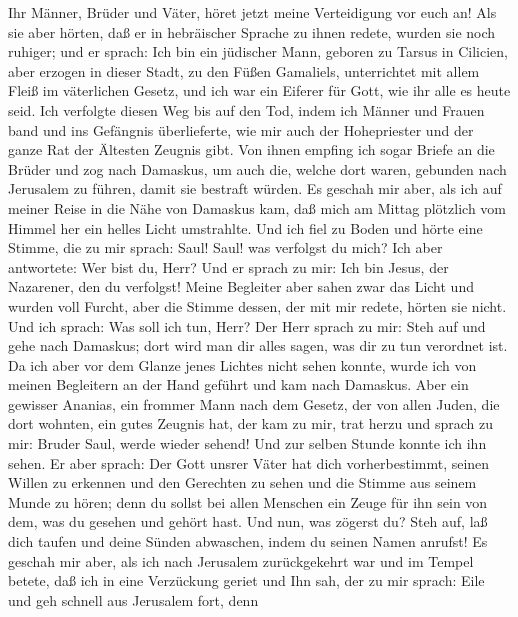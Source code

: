  Ihr Männer, Brüder und Väter, höret jetzt meine
Verteidigung vor euch an!  Als sie aber hörten, daß er in
hebräischer Sprache zu ihnen redete, wurden sie noch ruhiger; und er
sprach:  Ich bin ein jüdischer Mann, geboren zu Tarsus in
Cilicien, aber erzogen in dieser Stadt, zu den Füßen Gamaliels,
unterrichtet mit allem Fleiß im väterlichen Gesetz, und ich war ein
Eiferer für Gott, wie ihr alle es heute seid.  Ich
verfolgte diesen Weg bis auf den Tod, indem ich Männer und Frauen band
und ins Gefängnis überlieferte,  wie mir auch der
Hohepriester und der ganze Rat der Ältesten Zeugnis gibt. Von ihnen
empfing ich sogar Briefe an die Brüder und zog nach Damaskus, um auch
die, welche dort waren, gebunden nach Jerusalem zu führen, damit sie
bestraft würden.  Es geschah mir aber, als ich auf meiner
Reise in die Nähe von Damaskus kam, daß mich am Mittag plötzlich vom
Himmel her ein helles Licht umstrahlte.  Und ich fiel zu
Boden und hörte eine Stimme, die zu mir sprach: Saul! Saul! was
verfolgst du mich?  Ich aber antwortete: Wer bist du,
Herr? Und er sprach zu mir: Ich bin Jesus, der Nazarener, den du
verfolgst!  Meine Begleiter aber sahen zwar das Licht und
wurden voll Furcht, aber die Stimme dessen, der mit mir redete, hörten
sie nicht.  Und ich sprach: Was soll ich tun, Herr? Der
Herr sprach zu mir: Steh auf und gehe nach Damaskus; dort wird man dir
alles sagen, was dir zu tun verordnet ist.  Da ich aber
vor dem Glanze jenes Lichtes nicht sehen konnte, wurde ich von meinen
Begleitern an der Hand geführt und kam nach Damaskus. 
Aber ein gewisser Ananias, ein frommer Mann nach dem Gesetz, der von
allen Juden, die dort wohnten, ein gutes Zeugnis hat, 
der kam zu mir, trat herzu und sprach zu mir: Bruder Saul, werde wieder
sehend! Und zur selben Stunde konnte ich ihn sehen.  Er
aber sprach: Der Gott unsrer Väter hat dich vorherbestimmt, seinen
Willen zu erkennen und den Gerechten zu sehen und die Stimme aus seinem
Munde zu hören;  denn du sollst bei allen Menschen ein
Zeuge für ihn sein von dem, was du gesehen und gehört hast.
 Und nun, was zögerst du? Steh auf, laß dich taufen und
deine Sünden abwaschen, indem du seinen Namen anrufst! 
Es geschah mir aber, als ich nach Jerusalem zurückgekehrt war und im
Tempel betete, daß ich in eine Verzückung geriet  und Ihn
sah, der zu mir sprach: Eile und geh schnell aus Jerusalem fort, denn

